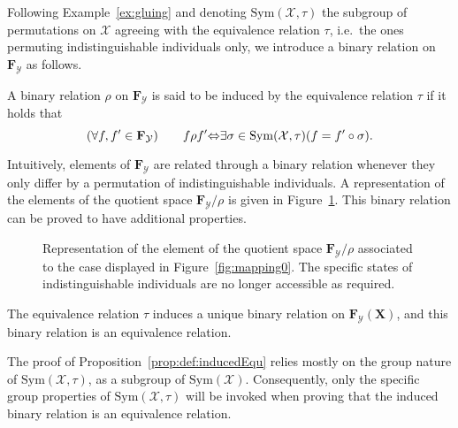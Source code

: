 \documentclass{aptpub}
\numberwithin{equation}{section}
\begin{document}
Following Example~\ref{ex:gluing} and denoting ${\mathrm{Sym}}({\mathcal{X}},\tau)$ the subgroup of permutations on ${\mathcal{X}}$ agreeing with the equivalence relation $\tau$, i.e.\ the ones permuting indistinguishable individuals only, we introduce a binary relation on ${\mathbf{F}}_{\mathcal{Y}}$ as follows.

\begin{definition}
\label{def:inducedEqu}
A binary relation $\rho$ on ${\mathbf{F}}_{\mathcal{Y}}$ is said to be induced by the equivalence relation $\tau$ if it holds that
{\begin{equation}\label{{eq:inducedEqu}}{
{({\forall f,f' \in {\mathbf{F}}_{\mathcal{Y}}})\qquad} f\rho f' {\Leftrightarrow} \exists \sigma \in {\mathrm{Sym}}({\mathcal{X}},\tau) ( f = f' \circ \sigma ).
}\end{equation}}
\end{definition}

Intuitively, elements of ${\mathbf{F}}_{\mathcal{Y}}$ are related through a binary relation whenever they only differ by a permutation of indistinguishable individuals. A representation of the elements of the quotient space ${\mathbf{F}}_{\mathcal{Y}}/\rho$ is given in Figure~\ref{fig:mapping1}. This binary relation can be proved to have additional properties.

\begin{figure}
\centering

\scriptsize

\caption{Representation of the element of the quotient space ${\mathbf{F}}_{\mathcal{Y}}/\rho$ associated to the case displayed in Figure~\ref{fig:mapping0}. The specific states of indistinguishable individuals are no longer accessible as required.}
\label{fig:mapping1}
\end{figure}

\begin{proposition}
\label{prop:def:inducedEqu}
The equivalence relation $\tau$ induces a unique binary relation on ${\mathbf{F}}_{\mathcal{Y}}({\mathbf{X}})$, and this binary relation is an equivalence relation.
\end{proposition}

The proof of Proposition~\ref{prop:def:inducedEqu} relies mostly on the group nature of ${\mathrm{Sym}}({\mathcal{X}},\tau)$, as a subgroup of ${\mathrm{Sym}}({\mathcal{X}})$. Consequently, only the specific group properties of ${\mathrm{Sym}}({\mathcal{X}},\tau)$ will be invoked when proving that the induced binary relation is an equivalence relation.
\end{document}
